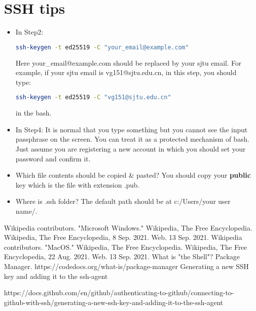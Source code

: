 \documentclass[11pt]{exam}
\begin{document}
\section{SSH tips}
\begin{itemize}
\item In Step2:
\begin{lstlisting}[language={sh}]
ssh-keygen -t ed25519 -C "your_email@example.com"
\end{lstlisting} 
Here your\_email@example.com should be replaced by your sjtu email. For example, if your sjtu email is vg151@sjtu.edu.cn, in this step, you should type:
\begin{lstlisting}[language={sh}]
ssh-keygen -t ed25519 -C "vg151@sjtu.edu.cn"
\end{lstlisting} 
in the bash.
\item In Step4: It is normal that you type something but you cannot see the input passphrase on the screen. You can treat it as a protected mechanism of bash. Just assume you are registering a new account in which you should set your password and confirm it.
\item Which file contents should be copied \& pasted? You should copy your \textbf{public} key which is the file with extension .pub.
\item Where is .ssh folder? The default path should be at c:/Users/your user name/. \cite{ref5} 
\end{itemize}
\newpage
\begin{thebibliography}{}
    Wikipedia contributors. "Microsoft Windows." Wikipedia, The Free Encyclopedia. Wikipedia, The Free Encyclopedia, 8 Sep. 2021. Web. 13 Sep. 2021.
    Wikipedia contributors. "MacOS." Wikipedia, The Free Encyclopedia. Wikipedia, The Free Encyclopedia, 22 Aug. 2021. Web. 13 Sep. 2021.
    What is "the Shell"? 
    Package Manager. https://codedocs.org/what-is/package-manager
    Generating a new SSH key and adding it to the ssh-agent \par https://docs.github.com/en/github/authenticating-to-github/connecting-to-github-with-ssh/generating-a-new-ssh-key-and-adding-it-to-the-ssh-agent
\end{thebibliography}
\end{document}
